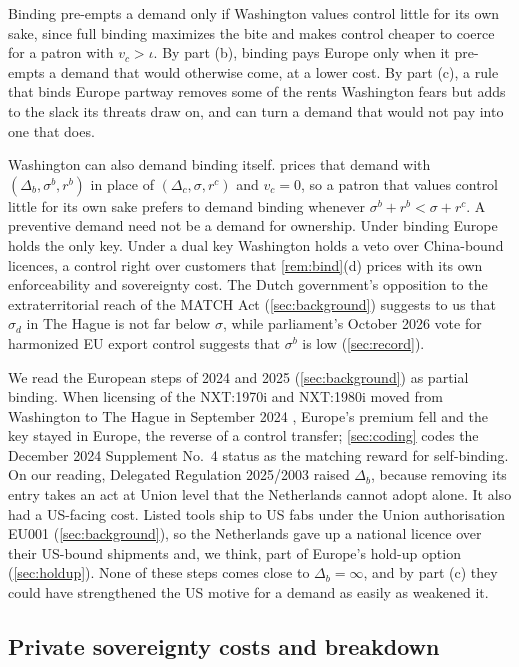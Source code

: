 Binding pre-empts a demand only if Washington values control little for its own sake, since full binding maximizes the bite and makes control cheaper to coerce for a patron with $v_c>\iota$. By part (b), binding pays Europe only when it pre-empts a demand that would otherwise come, at a lower cost. By part (c), a rule that binds Europe partway removes some of the rents Washington fears but adds to the slack its threats draw on, and can turn a demand that would not pay into one that does.

Washington can also demand binding itself.  prices that demand with $(\Delta_b,\sigma^b,r^b)$ in place of $(\Delta_c,\sigma,r^c)$ and $v_c=0$, so a patron that values control little for its own sake prefers to demand binding whenever $\sigma^b+r^b<\sigma+r^c$. A preventive demand need not be a demand for ownership. Under binding Europe holds the only key. Under a dual key Washington holds a veto over China-bound licences, a control right over customers that \cref{rem:bind}(d) prices with its own enforceability and sovereignty cost. The Dutch government's opposition to the extraterritorial reach of the MATCH Act (\cref{sec:background}) suggests to us that $\sigma_d$ in The Hague is not far below $\sigma$, while parliament's October 2026 vote for harmonized EU export control suggests that $\sigma^b$ is low (\cref{sec:record}).

We read the European steps of 2024 and 2025 (\cref{sec:background}) as partial binding. When licensing of the NXT:1970i and NXT:1980i moved from Washington to The Hague in September 2024 \citep{stcrt2024duv}, Europe's premium fell and the key stayed in Europe, the reverse of a control transfer; \cref{sec:coding} codes the December 2024 Supplement No.~4 status as the matching reward for self-binding. On our reading, Delegated Regulation 2025/2003 \citep{eu2025dualuse} raised $\Delta_b$, because removing its entry takes an act at Union level that the Netherlands cannot adopt alone. It also had a US-facing cost. Listed tools ship to US fabs under the Union authorisation EU001 (\cref{sec:background}), so the Netherlands gave up a national licence over their US-bound shipments and, we think, part of Europe's hold-up option (\cref{sec:holdup}). None of these steps comes close to $\Delta_b=\infty$, and by part (c) they could have strengthened the US motive for a demand as easily as weakened it.

\subsection{Private sovereignty costs and breakdown}\label{sec:breakdown}


